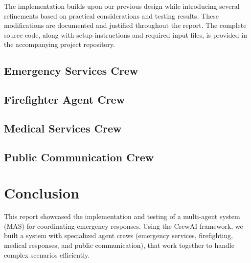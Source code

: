\documentclass[a4paper]{article}
\begin{document}
The implementation builds upon our previous design while introducing several refinements based on practical considerations and testing results. These modifications are documented and justified throughout the report. The complete source code, along with setup instructions and required input files, is provided in the accompanying project repository.







\subsection{Emergency Services Crew}



\subsection{Firefighter Agent Crew}



\subsection{Medical Services Crew}



\subsection{Public Communication Crew}







\section{Conclusion}
\label{sec:conclusion}

This report showcased the implementation and testing of a multi-agent system (MAS) for coordinating emergency responses. 
Using the CrewAI framework, we built a system with specialized agent crews (emergency services, firefighting, medical responses,
 and public communication), that work together to handle complex scenarios efficiently. 
 
\end{document}
